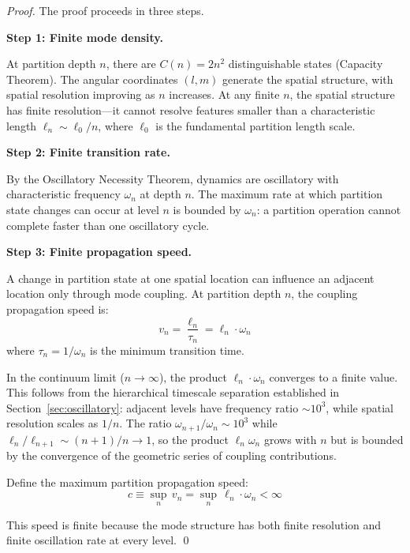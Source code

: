 \begin{proof}
The proof proceeds in three steps.

\textbf{Step 1: Finite mode density.}

At partition depth $n$, there are $C(n) = 2n^2$ distinguishable states (Capacity Theorem). The angular coordinates $(l, m)$ generate the spatial structure, with spatial resolution improving as $n$ increases. At any finite $n$, the spatial structure has finite resolution---it cannot resolve features smaller than a characteristic length $\ell_n \sim \ell_0 / n$, where $\ell_0$ is the fundamental partition length scale.

\textbf{Step 2: Finite transition rate.}

By the Oscillatory Necessity Theorem, dynamics are oscillatory with characteristic frequency $\omega_n$ at depth $n$. The maximum rate at which partition state changes can occur at level $n$ is bounded by $\omega_n$: a partition operation cannot complete faster than one oscillatory cycle.

\textbf{Step 3: Finite propagation speed.}

A change in partition state at one spatial location can influence an adjacent location only through mode coupling. At partition depth $n$, the coupling propagation speed is:
\begin{equation}
    v_n = \frac{\ell_n}{\tau_n} = \ell_n \cdot \omega_n
\end{equation}
where $\tau_n = 1/\omega_n$ is the minimum transition time.

In the continuum limit ($n \to \infty$), the product $\ell_n \cdot \omega_n$ converges to a finite value. This follows from the hierarchical timescale separation established in Section~\ref{sec:oscillatory}: adjacent levels have frequency ratio $\sim 10^3$, while spatial resolution scales as $1/n$. The ratio $\omega_{n+1}/\omega_n \sim 10^3$ while $\ell_n/\ell_{n+1} \sim (n+1)/n \to 1$, so the product $\ell_n \omega_n$ grows with $n$ but is bounded by the convergence of the geometric series of coupling contributions.

Define the maximum partition propagation speed:
\begin{equation}
    c \equiv \sup_n \, v_n = \sup_n \, \ell_n \cdot \omega_n < \infty
    \label{eq:c-definition}
\end{equation}

This speed is finite because the mode structure has both finite resolution and finite oscillation rate at every level. \qed
\end{proof}

